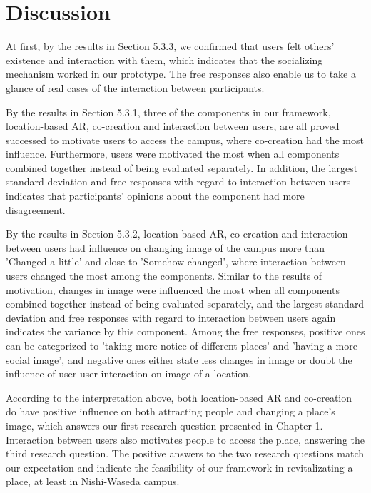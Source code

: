 \chapter{Discussion}\label{ch:6}


At first, by the results in Section 5.3.3, we confirmed that users felt others' existence and interaction with them, which indicates that the socializing mechanism worked in our prototype.
The free responses also enable us to take a glance of real cases of the interaction between participants.

By the results in Section 5.3.1, three of the components in our framework, location-based AR, co-creation and interaction between users, are all proved successed to motivate users to access the campus, where co-creation had the most influence.
Furthermore, users were motivated the most when all components combined together instead of being evaluated separately.
In addition, the largest standard deviation and free responses with regard to interaction between users indicates that participants' opinions about the component had more disagreement.

By the results in Section 5.3.2, location-based AR, co-creation and interaction between users had influence on changing image of the campus more than 'Changed a little' and close to 'Somehow changed',
where interaction between users changed the most among the components.
Similar to the results of motivation, changes in image were influenced the most when all components combined together instead of being evaluated separately,
and the largest standard deviation and free responses with regard to interaction between users again indicates the variance by this component.
Among the free responses, positive ones can be categorized to 'taking more notice of different places' and 'having a more social image',
and negative ones either state less changes in image or doubt the influence of user-user interaction on image of a location.

According to the interpretation above, both location-based AR and co-creation do have positive influence on both attracting people and changing a place's image, which answers our first research question presented in Chapter 1.
Interaction between users also motivates people to access the place, answering the third research question.
The positive answers to the two research questions match our expectation and indicate the feasibility of our framework in revitalizating a place, at least in Nishi-Waseda campus.

